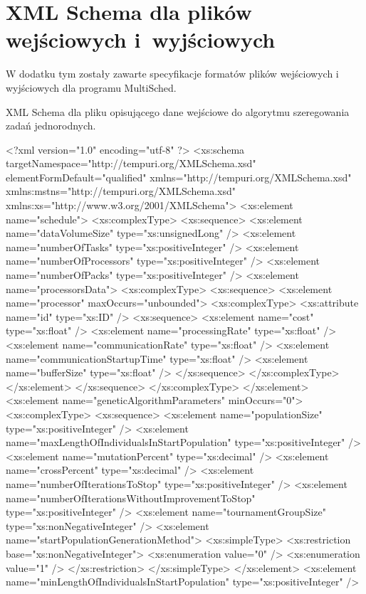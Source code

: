 
\chapter{XML Schema dla plików wejściowych i~wyjściowych}\label{schema}

W dodatku tym zostały zawarte specyfikacje formatów plików wejściowych i wyjściowych dla programu MultiSched.

\begin{listing}
\caption{XML Schema dla pliku opisującego dane wejściowe do algorytmu szeregowania zadań jednorodnych.}
\begin{codeblock}
<?xml version="1.0" encoding="utf-8" ?>
<xs:schema targetNamespace="http://tempuri.org/XMLSchema.xsd"  elementFormDefault="qualified"
xmlns="http://tempuri.org/XMLSchema.xsd" xmlns:mstns="http://tempuri.org/XMLSchema.xsd"
xmlns:xs="http://www.w3.org/2001/XMLSchema">
<xs:element name="schedule">
<xs:complexType>
<xs:sequence>
<xs:element name="dataVolumeSize" type="xs:unsignedLong" />
<xs:element name="numberOfTasks" type="xs:positiveInteger" />
<xs:element name="numberOfProcessors" type="xs:positiveInteger" />
<xs:element name="numberOfPacks" type="xs:positiveInteger" />
<xs:element name="processorsData">
<xs:complexType>
<xs:sequence>
<xs:element name="processor" maxOccurs="unbounded">
<xs:complexType>
<xs:attribute name="id" type="xs:ID" />
<xs:sequence>
<xs:element name="cost" type="xs:float" />
<xs:element name="processingRate" type="xs:float" />
<xs:element name="communicationRate" type="xs:float" />
<xs:element name="communicationStartupTime" type="xs:float" />
<xs:element name="bufferSize" type="xs:float" />
</xs:sequence>
</xs:complexType>
</xs:element>
</xs:sequence>
</xs:complexType>
</xs:element>
<xs:element name="geneticAlgorithmParameters" minOccurs="0">
<xs:complexType>
<xs:sequence>
<xs:element name="populationSize" type="xs:positiveInteger" />
<xs:element name="maxLengthOfIndividualsInStartPopulation" type="xs:positiveInteger" />
<xs:element name="mutationPercent" type="xs:decimal" />
<xs:element name="crossPercent" type="xs:decimal" />
<xs:element name="numberOfIterationsToStop" type="xs:positiveInteger" />
<xs:element name="numberOfIterationsWithoutImprovementToStop" type="xs:positiveInteger" />
<xs:element name="tournamentGroupSize"  type="xs:nonNegativeInteger" />
<xs:element name="startPopulationGenerationMethod">
<xs:simpleType>
<xs:restriction base="xs:nonNegativeInteger">
<xs:enumeration value="0" />
<xs:enumeration value="1" />
</xs:restriction>
</xs:simpleType>
</xs:element>
<xs:element name="minLengthOfIndividualsInStartPopulation" type="xs:positiveInteger" />

\end{codeblock}
\end{listing}

